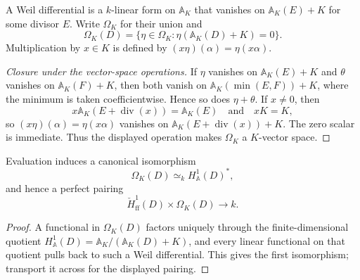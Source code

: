 \begin{definition}
  \label{def:adelic_weil_differentials}
  A Weil differential is a \(k\)-linear form on \(\mathbb A_K\) that
  vanishes on \(\mathbb A_K(E)+K\) for some divisor \(E\).  Write
  \(\Omega_K\) for their union and
  \[
    \Omega_K(D)=
      \{\eta\in\Omega_K:\eta(\mathbb A_K(D)+K)=0\}.
  \]
  Multiplication by \(x\in K\) is defined by
  \((x\eta)(\alpha)=\eta(x\alpha)\).
\end{definition}
\begin{proof}[Closure under the vector-space operations]
  If \(\eta\) vanishes on \(\mathbb A_K(E)+K\) and \(\theta\) vanishes
  on \(\mathbb A_K(F)+K\), then both vanish on
  \(\mathbb A_K(\min(E,F))+K\), where the minimum is taken
  coefficientwise.  Hence so does \(\eta+\theta\).  If \(x\ne0\), then
  \[
    x\mathbb A_K(E+\operatorname{div}(x))=\mathbb A_K(E)
    \quad\text{and}\quad xK=K,
  \]
  so \((x\eta)(\alpha)=\eta(x\alpha)\) vanishes on
  \(\mathbb A_K(E+\operatorname{div}(x))+K\).  The zero scalar is
  immediate.
  Thus the displayed operation makes \(\Omega_K\) a \(K\)-vector
  space.
\end{proof}

\begin{proposition}
  \label{thm:adelic_residuePairing}
  \notready
  Evaluation induces a canonical isomorphism
  \[
    \Omega_K(D)\simeq_k H^1_{\mathbb A}(D)^*,
  \]
  and hence a perfect pairing
  \[
    \check H^1_{\mathrm{ff}}(D)\times\Omega_K(D)\longrightarrow k.
  \]
\end{proposition}
\begin{proof}
  A functional in \(\Omega_K(D)\) factors uniquely through the
  finite-dimensional quotient
  \(H^1_{\mathbb A}(D)=\mathbb A_K/(\mathbb A_K(D)+K)\), and every linear
  functional on that quotient pulls back to such a Weil differential.
  This gives the first isomorphism; transport it across
   for the displayed pairing.
\end{proof}

